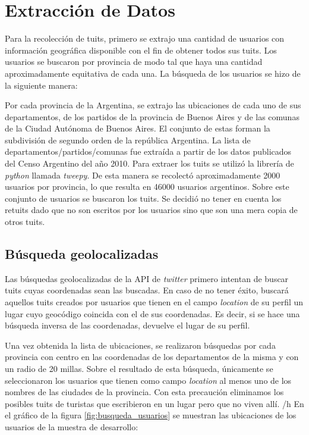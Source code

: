 

\section{Extracción de Datos}

Para la recolección de tuits, primero se extrajo una cantidad de usuarios con información geográfica disponible con el fin de obtener todos sus tuits.
Los usuarios se buscaron por provincia de modo tal que haya una cantidad aproximadamente equitativa de cada una.
La búsqueda de los usuarios se hizo de la siguiente manera:

Por cada provincia de la Argentina, se extrajo las ubicaciones de cada uno de sus departamentos, de los partidos de la provincia de Buenos Aires y de las comunas de la Ciudad Autónoma de Buenos Aires. El conjunto de estas forman la subdivisión de segundo orden de la república Argentina. La lista de departamentos/partidos/comunas fue extraída a partir de los datos publicados del Censo Argentino del año 2010. Para extraer los tuits se utilizó la librería de \textit{python} llamada \textit{tweepy}.
De esta manera se recolectó aproximadamente 2000 usuarios por provincia, lo que resulta en 46000 usuarios argentinos. Sobre este conjunto de usuarios se buscaron los tuits. Se decidió no tener en cuenta los retuits dado que no son escritos por los usuarios sino que son una mera copia de otros tuits. 


\subsection{Búsqueda geolocalizadas}

Las búsquedas geolocalizadas de la API de \textit{twitter} primero intentan de buscar tuits cuyas coordenadas sean las buscadas. En caso de no tener éxito, buscará aquellos tuits creados por usuarios que tienen en el campo \textit{location} de su perfil un lugar cuyo geocódigo coincida con el de sus coordenadas. Es decir, si se hace una búsqueda inversa de las coordenadas, devuelve el lugar de su perfil.

Una vez obtenida la lista de ubicaciones, se realizaron búsquedas por cada provincia con centro en las coordenadas de los departamentos de la misma y con un radio de 20 millas. Sobre el resultado de esta búsqueda, únicamente se seleccionaron los usuarios que tienen como campo \textit{location} al menos uno de los nombres de las ciudades de la provincia. Con esta precaución eliminamos los posibles tuits de turistas que escribieron en un lugar pero que no viven allí.
/h
En el gráfico de la figura \ref{fig:busqueda_usuarios} se muestran las ubicaciones de los usuarios de la muestra de desarrollo:



